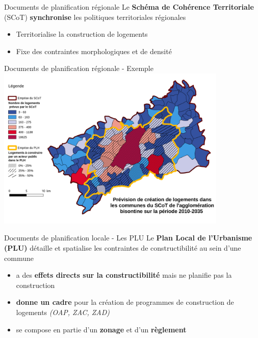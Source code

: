 \documentclass[xcolor=table]{beamer}
\begin{document}
\begin{frame}{Documents de planification régionale}
Le \textbf{Schéma de Cohérence Territoriale} (SCoT) \textbf{synchronise} les politiques territoriales régionales
\begin{itemize}
\item Territorialise la construction de logements
\item Fixe des contraintes morphologiques et de densité
\end{itemize}
\end{frame}

\begin{frame}{Documents de planification régionale - Exemple}
\includegraphics[width=11cm]{cartes/prevision-plh.png}
\end{frame}

\begin{frame}{Documents de planification locale - Les PLU}
Le \textbf{Plan Local de l’Urbanisme (PLU)} détaille et spatialise les contraintes de constructibilité au sein d’une commune
\begin{itemize}
\item a des \textbf{effets directs sur la constructibilité} mais ne planifie pas la construction 
\item \textbf{donne un cadre} pour la création de programmes de construction de logements \textit{(OAP, ZAC, ZAD)}
\item se compose en partie d'un \textbf{zonage} et d'un \textbf{règlement}
\end{itemize}
\end{frame}	
\end{document}
